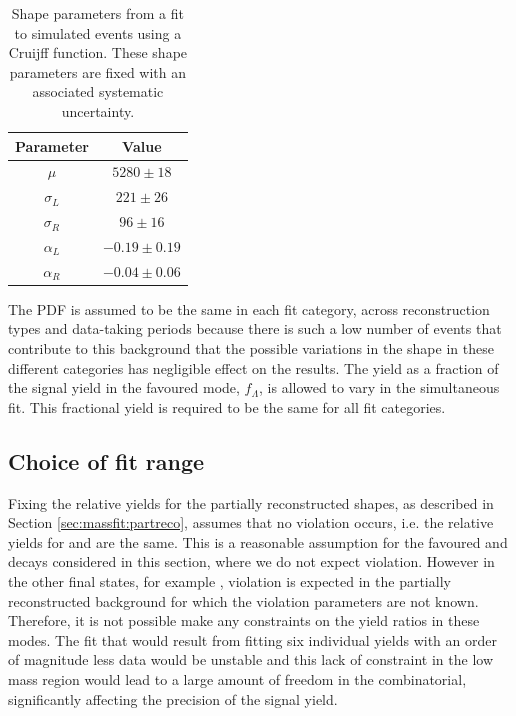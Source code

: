 \begin{table}[h]
\centering
\begin{tabular}{cc}
\hline
Parameter & Value \\
\hline
$\mu$ & $5280 \pm 18$ \\
$\sigma_L$ & $221 \pm 26$ \\
$\sigma_R$ & $96 \pm 16$ \\
$\alpha_L$ & $-0.19 \pm 0.19$ \\
$\alpha_R$ & $-0.04 \pm 0.06$ \\
\hline
\end{tabular}
\caption{Shape parameters from a fit to simulated \decay{\Lb}{\Lc\Km} events using a Cruijff function. These shape parameters are fixed with an associated systematic uncertainty.}
\label{fitresultsLb}
\end{table}

The PDF is assumed to be the same in each \kk fit category, across \KS reconstruction types and data-taking periods because there is such a low number of events that contribute to this background that the possible variations in the shape in these different categories has negligible effect on the results. The  yield as a fraction of the signal yield in the favoured \kpi mode, $f_{\Lambda}$, is allowed to vary in the simultaneous fit. This fractional yield is required to be the same for all fit categories.

\subsection{Choice of fit range}
\label{sec:cpfit:range}	

Fixing the relative yields for the partially reconstructed shapes, as described in Section \ref{sec:massfit:partreco}, assumes that no \CP violation occurs, i.e. the relative yields for \Bm and \Bp are the same. This is a reasonable assumption for the favoured \kpi and \kpipipi decays considered in this section, where we do not expect \CP violation. However in the other \D final states, for example \pik, \CP violation is expected in the partially reconstructed background for which the \CP violation parameters are not known. Therefore, it is not possible make any constraints on the yield ratios in these modes. The fit that would result from fitting six individual yields with an order of magnitude less data would be unstable and this lack of constraint in the low mass region would lead to a large amount of freedom in the combinatorial, significantly affecting the precision of the signal yield. 

